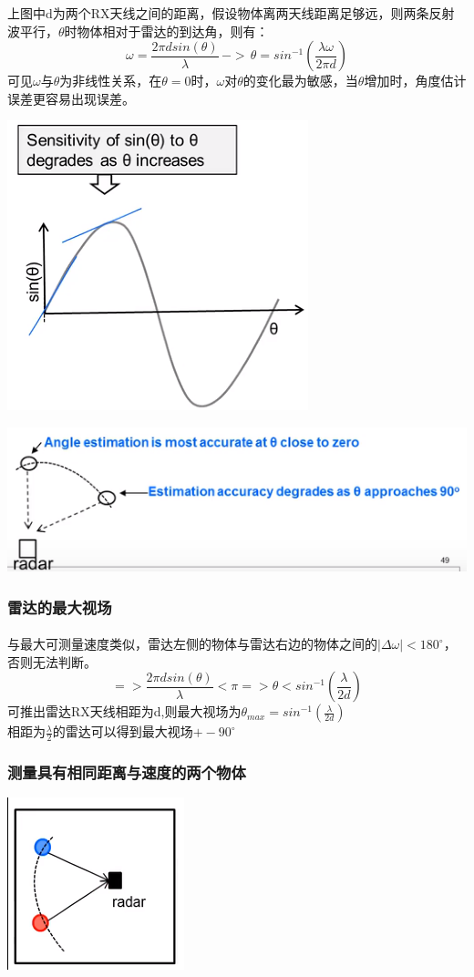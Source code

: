 \documentclass[UTF8]{ctexart}
\begin{document}
上图中d为两个RX天线之间的距离，假设物体离两天线距离足够远，则两条反射波平行，$\theta$时物体相对于雷达的到达角，则有：
\[\omega=\frac{2\pi d sin(\theta)}{\lambda} \, -> \, \theta=sin^{-1}(\frac{\lambda \omega}{2\pi d})\]
可见$\omega$与$\theta$为非线性关系，在$\theta =0$时，$\omega$对$\theta$的变化最为敏感，当$\theta$增加时，角度估计误差更容易出现误差。

{\centering \includegraphics[width = .3\textwidth]{pic/sensitivety.png}

}
{\centering \includegraphics[width = .7\textwidth]{pic/thetasens.png}

}

\subsubsection{雷达的最大视场}
\paragraph{}与最大可测量速度类似，雷达左侧的物体与雷达右边的物体之间的$|\Delta \omega|<180^{\circ}$，否则无法判断。\\
\[=> \frac{2\pi d sin(\theta)}{\lambda}<\pi=>\theta<sin^{-1}(\frac{\lambda}{2d})\]
可推出雷达RX天线相距为d,则最大视场为\(\theta_{max}=sin^{-1}(\frac{\lambda}{2d})\)\\
相距为$\frac{\lambda}{2}$的雷达可以得到最大视场$+-90^{\circ}$\\
\subsubsection{测量具有相同距离与速度的两个物体}
{\centering \includegraphics[width = .2\textwidth]{pic/sametwo.png}

}
\end{document}

